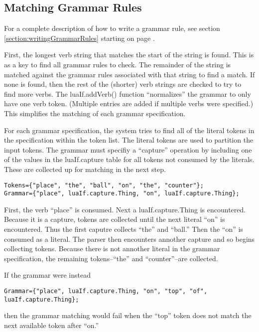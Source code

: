 \documentclass{book}
\newcommand{\myref}[1]{\ref{#1} starting on page \pageref{#1}}
\begin{document}
\subsection{Matching Grammar Rules}
\label{section:matchingGrammarRules}

For a complete description of how to write a grammar rule, see
section \myref{section:writingGrammarRules}.

First, the longest verb string that matches the start of the string is
found. This is as a key to find all grammar rules to check. The
remainder of the string is matched against the grammar rules
associated with that string to find a match. If none is found, then
the rest of the (shorter) verb strings are checked to try to find more
verbs. The luaIf.addVerb() function ``normalizes'' the grammar to only
have one verb token. (Multiple entries are added if multiple verbs
were specified.) This simplifies the matching of each grammar
specification.

For each grammar specification, the system tries to find all of the
literal tokens in the specification within the token list. The literal
tokens are used to partition the input tokens. The grammar must
specifiy a ``capture'' operation by including one of the values in the
luaIf.capture table for all tokens not consumed by the literals. These
are collected up for matching in the next step.

\begin{verbatim}
Tokens={"place", "the", "ball", "on", "the", "counter"};
Grammar={"place", luaIf.capture.Thing, "on", luaIf.capture.Thing};
\end{verbatim}

First, the verb ``place'' is consumed. Next a luaIf.capture.Thing is
encountered. Because it is a capture, tokens are collected until the
next literal ``on'' is encountered. Thus the first caputre collects
``the'' and ``ball.'' Then the ``on'' is consumed as a literal. The
parser then encounters annother capture and so begins collecting
tokens. Because there is not annother literal in the grammar
specification, the remaining tokens--``the'' and ``counter''--are
collected.

If the grammar were instead

\begin{verbatim}
Grammar={"place", luaIf.capture.Thing, "on", "top", "of",
luaIf.capture.Thing};
\end{verbatim}

\noindent then the grammar matching would fail when the ``top'' token
does not match the next available token after ``on.''
\end{document}
